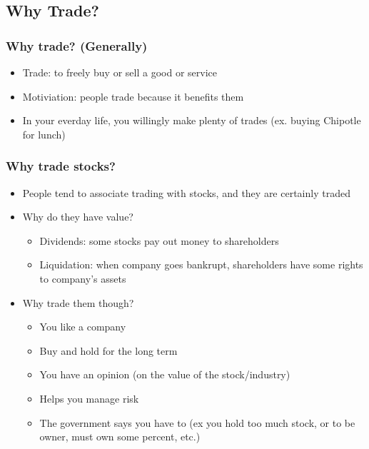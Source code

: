 
\subsection{Why Trade?}

\subsubsection{Why trade? (Generally)}

\begin{itemize}
    \item Trade: to freely buy or sell a good or service
    \item Motiviation: people trade because it benefits them
    \item In your everday life, you willingly make plenty of trades (ex. buying Chipotle for lunch)
\end{itemize}

\subsubsection{Why trade stocks?}
\begin{itemize}
    \item People tend to associate trading with stocks, and they are certainly traded
    \item Why do they have value?
        \begin{itemize}
            \item Dividends: some stocks pay out money to shareholders
            \item Liquidation: when company goes bankrupt, shareholders have some rights to company's assets
        \end{itemize}
    \item Why trade them though?
        \begin{itemize}
            \item You like a company
            \item Buy and hold for the long term
            \item You have an opinion (on the value of the stock/industry)
            \item Helps you manage risk
            \item The government says you have to (ex you hold too much stock, or to be owner, must own some percent, etc.)
        \end{itemize}
\end{itemize}

